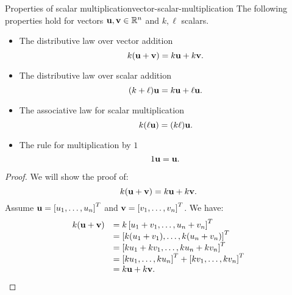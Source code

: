 \begin{theorem}{Properties of scalar multiplication}{vector-scalar-multiplication}
  The following properties hold for vectors
  $\vect{u},\vect{v}\in\R^n$ and $k,\ell$ scalars.%
  \begin{itemize}
  \item The distributive law over vector addition
    \begin{equation*}
      k(\vect{u} + \vect{v}) = k\vect{u} + k\vect{v}.
    \end{equation*}
  \item The distributive law over scalar addition
    \begin{equation*}
      (k + \ell) \vect{u} = k\vect{u} + \ell\vect{u}.
    \end{equation*}
  \item The associative law for scalar multiplication
    \begin{equation*}
      k(\ell\vect{u}) = (k\ell)\vect{u}.
    \end{equation*}
  \item The rule for multiplication by $1$
    \begin{equation*}
      1\vect{u}=\vect{u}.
    \end{equation*}
  \end{itemize}
\end{theorem}

\begin{proof}
  We will show the proof of:
  \begin{equation*}
    k(\vect{u} + \vect{v}) = k\vect{u} + k\vect{v}.
  \end{equation*}
  Assume $\vect{u}=\mat{u_1,\ldots,u_n}^T$ and
  $\vect{v}=\mat{v_1,\ldots,v_n}^T$. We have:
  \begin{equation*}
    \begin{array}{ll}
      k(\vect{u} + \vect{v}) & = k\mat{u_1 + v_1,\ldots,u_n + v_n}^T \\
                             & = \mat{k(u_1 + v_1), \ldots, k(u_n + v_n)}^T \\
                             & = \mat{ku_1 + k v_1, \ldots, ku_n + kv_n}^T \\
                             & = \mat{ku_1, \ldots, ku_n}^T + \mat{kv_1, \ldots, kv_n}^T \\
                             & = k\vect{u} + k\vect{v}.
    \end{array}
  \end{equation*}
\end{proof}

